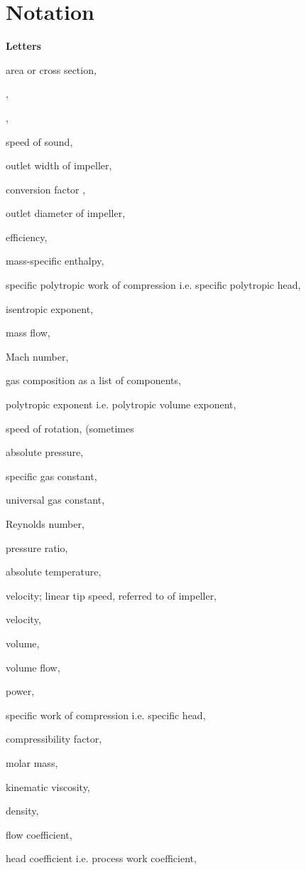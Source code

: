 \documentclass{article}
\begin{document}
\bigskip

\newpage

\section{Notation\textbf{\ }}

\textbf{Letters}

 area or cross section, 

, 

, 

 speed of sound, 

 outlet width of impeller, 

 conversion factor , 

 outlet diameter of impeller, 

 efficiency, 

 mass-specific enthalpy, 

 specific polytropic work of compression i.e. specific polytropic
head, 

 isentropic exponent, 

 mass flow, 

 Mach number, 

 gas composition as a list of components, 

 polytropic exponent i.e. polytropic volume exponent, 

 speed of rotation,  (sometimes 

 absolute pressure, 

 specific gas constant, 

 universal gas constant, 

 Reynolds number, 

 pressure ratio, 

 absolute temperature, 

 velocity; linear tip speed, referred to  of impeller, 

 velocity, 

 volume, 

 volume flow, 

 power, 

 specific work of compression i.e. specific head, 

 compressibility factor, 

 molar mass, 

 kinematic viscosity, 

 density, 

 flow coefficient, 

 head coefficient i.e. process work coefficient, 
\end{document}
